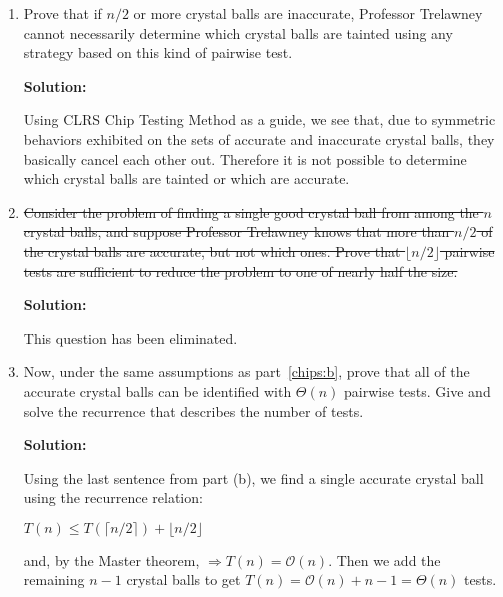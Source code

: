 \documentclass[12pt]{article}
\begin{document}
\begin{enumerate}
	\begin{enumerate}
		\item Prove that if $n/2$ or more crystal balls are inaccurate, Professor Trelawney cannot necessarily determine which 
		crystal balls are tainted using any strategy based on this kind of pairwise test.\par
		\textbf{Solution:}\par
		Using CLRS Chip Testing Method as a guide, we see that, due to symmetric behaviors exhibited on the sets of accurate
		and inaccurate crystal balls, they basically cancel each other out. Therefore it is not possible to determine which
		crystal balls are tainted or which are accurate.
		\item \label{chips:b} \sout{Consider the problem of finding a single good crystal ball from among the $n$ crystal balls, and 
		suppose Professor Trelawney knows that more than $n/2$ of the crystal balls are accurate, but not which ones. 
		Prove that $\lfloor n/2\rfloor$ pairwise tests are sufficient to reduce the problem to one of nearly half the size.}\par
		\textbf{Solution:}\par
		This question has been eliminated.
		\item Now, under the same assumptions as part~\eqref{chips:b}, prove that all of the accurate crystal balls can be 
		identified with $\Theta(n)$ pairwise tests. Give and solve the recurrence that describes the number of tests.\par
		\textbf{Solution:}\par
		Using the last sentence from part (b), we find a single accurate crystal ball using the recurrence relation:\par
		$T(n)\leq T(\lceil n/2\rceil)+\lfloor n/2\rfloor$\par
		and, by the Master theorem, $\Rightarrow T(n)=\mathcal{O}(n)$. Then we add the remaining $n-1$ crystal balls to get $T(n)=\mathcal{O}(n)+n-1 =\Theta(n)$ tests.
\newpage

	\end{enumerate}

    \newpage


\end{enumerate}
\end{document}
